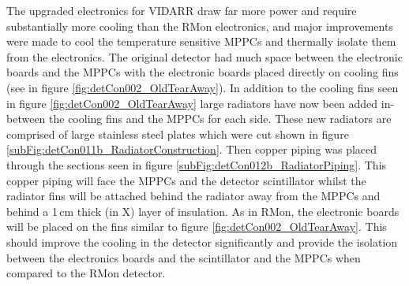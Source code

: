 The upgraded electronics for VIDARR draw far more power and require substantially more cooling than the RMon electronics, and major improvements were made to cool the temperature sensitive MPPCs and thermally isolate them from the electronics. The original detector had much space between the electronic boards and the MPPCs with the electronic boards placed directly on cooling fins (see in figure \ref{fig:detCon002_OldTearAway}). In addition to the cooling fins seen in figure \ref{fig:detCon002_OldTearAway} large radiators have now been added in-between the cooling fins and the MPPCs for each side. These new radiators are comprised of large stainless steel plates which were cut shown in figure \ref{subFig:detCon011b_RadiatorConstruction}. Then copper piping was placed through the sections seen in figure \ref{subFig:detCon012b_RadiatorPiping}. This copper piping will face the MPPCs and the detector scintillator whilst the radiator fins will be attached behind the radiator away from the MPPCs and behind a 1\,cm thick (in X) layer of insulation. As in RMon, the electronic boards will be placed on the fins similar to figure \ref{fig:detCon002_OldTearAway}. This should improve the cooling in the detector significantly and provide the isolation between the electronics boards and the scintillator and the MPPCs when compared to the RMon detector. 


